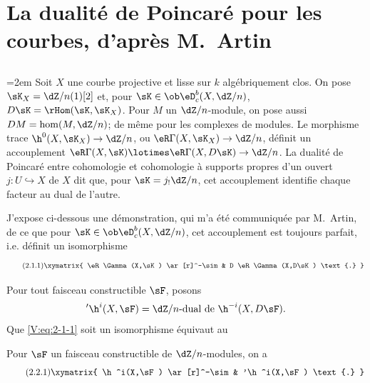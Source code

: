 \section{La dualité de Poincaré pour les courbes, d'après M.\ Artin}\label{V:2}





\subsection{}\label{V:2-1}

\begingroup
\emergencystretch=2em\relax
Soit $X$ une courbe projective et lisse sur $k$ algébriquement clos. On pose 
$\sK_X=\dZ/n(1)[2]$ et, pour $\sK\in\ob \eD_c^b(X,\dZ/n)$, 
$D\sK=\rHom(\sK,\sK_X)$. Pour $M$ un $\dZ/n$-module, on pose aussi 
$D M = \hom(M,\dZ/n)$; de même pour les complexes de modules. Le morphisme 
trace $\h^0(X,\sK_X) \to \dZ/n$, ou $\eR\Gamma(X,\sK_X)\to \dZ/n$, définit un 
accouplement $\eR\Gamma(X,\sK)\lotimes\eR\Gamma(X,D\sK) \to \dZ/n$. La dualité 
de Poincaré entre cohomologie et cohomologie à supports propres d'un ouvert 
$j:U\hookrightarrow X$ de $X$ dit que, pour $\sK=j_!\dZ/n$, cet accouplement 
identifie chaque facteur au dual de l'autre.\par
\endgroup 

J'expose ci-dessous une démonstration, qui m'a été communiquée par 
M.\ Artin, de ce que pour $\sK\in\ob\eD_c^b(X,\dZ/n)$, cet accouplement est 
toujours parfait, i.e. définit un isomorphisme
\begin{equation*}\tag{2.1.1}\label{V:eq:2-1-1}
\xymatrix{
  \eR\Gamma(X,\sK) \ar[r]^-\sim 
    & D \eR\Gamma(X,D\sK) \text{.}
}
\end{equation*}

Pour tout faisceau constructible $\sF$, posons 
\[
  '\h^i(X,\sF) = \text{$\dZ/n$-dual de $\h^{-i}(X,D\sF)$.}
\]
Que \eqref{V:eq:2-1-1} soit un isomorphisme équivaut au 





\begin{theorem_}\label{V:2-2}
Pour $\sF$ un faisceau constructible de $\dZ/n$-modules, on a 
\begin{equation*}\tag{2.2.1}\label{V:eq:2-2-1}
\xymatrix{
  \h^i(X,\sF) \ar[r]^-\sim 
    & '\h^i(X,\sF) \text{.}
}
\end{equation*}
\end{theorem_}





